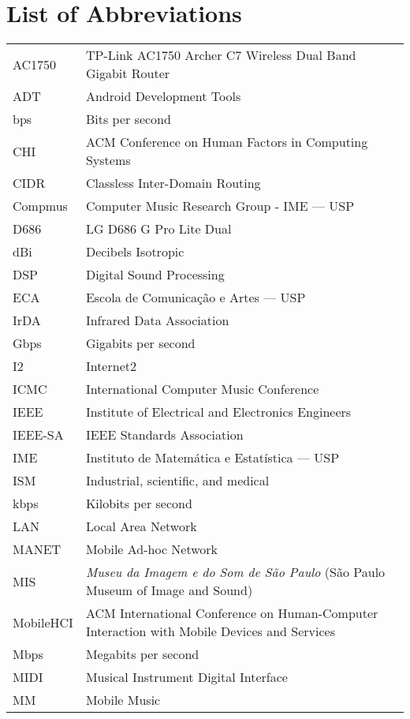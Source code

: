 \documentclass[11pt,twoside,a4paper]{book}
\begin{document}
	\chapter{List of Abbreviations}
	\begin{longtable}{ll}
		AC1750		& TP-Link AC1750 Archer C7 Wireless Dual Band Gigabit Router\\
        ADT         & Android Development Tools\\
		bps         & Bits per second\\
		CHI		    & ACM Conference on Human Factors in Computing Systems\\
		CIDR        & Classless Inter-Domain Routing\\
		Compmus		& Computer Music Research Group - IME --- USP\\
		D686		& LG D686 G Pro Lite Dual\\
		dBi         & Decibels Isotropic\\
		DSP		    & Digital Sound Processing\\
		ECA 	    & Escola de Comunicação e Artes --- USP\\	
		IrDA        & Infrared Data Association\\
		Gbps        & Gigabits per second\\
		I2		    & Internet2\\ 
		ICMC		& International Computer Music Conference\\
		IEEE        & Institute of Electrical and Electronics Engineers\\
		IEEE-SA     & IEEE Standards Association\\
		IME		    & Instituto de Matemática e Estatística --- USP\\
		ISM         & Industrial, scientific, and medical\\
		kbps        & Kilobits per second\\
		LAN         & Local Area Network\\
		MANET       & Mobile Ad-hoc Network\\
		MIS		    & \textit{Museu da Imagem e do Som de São Paulo} (São Paulo Museum of Image and Sound)\\ 
		MobileHCI	& ACM International Conference on Human-Computer Interaction with Mobile Devices and Services\\
		Mbps        & Megabits per second\\
		MIDI        & Musical Instrument Digital Interface\\
		MM          & Mobile Music\\

\end{longtable}
\end{document}
